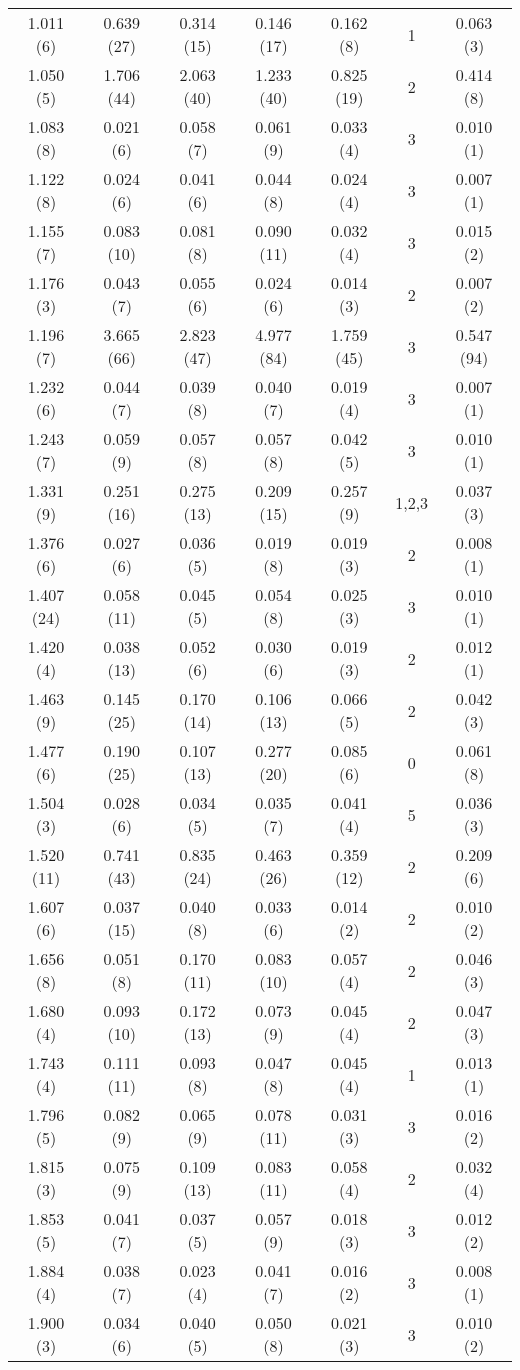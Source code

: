 \begin{table}
\begin{tabular}{c c c c c c c}
1.011 (6) & 0.639 (27) & 0.314 (15) & 0.146 (17) & 0.162 (8) & 1 & 0.063 (3) \\
1.050 (5) & 1.706 (44) & 2.063 (40) & 1.233 (40) & 0.825 (19) & 2 & 0.414 (8) \\
1.083 (8) & 0.021 (6) & 0.058 (7) & 0.061 (9) & 0.033 (4) & 3 & 0.010 (1) \\
1.122 (8) & 0.024 (6) & 0.041 (6) & 0.044 (8) & 0.024 (4) & 3 & 0.007 (1) \\
1.155 (7) & 0.083 (10) & 0.081 (8) & 0.090 (11) & 0.032 (4) & 3 & 0.015 (2) \\
1.176 (3) & 0.043 (7) & 0.055 (6) & 0.024 (6) & 0.014 (3) & 2 & 0.007 (2) \\
1.196 (7) & 3.665 (66) & 2.823 (47) & 4.977 (84) & 1.759 (45) & 3 & 0.547 (94) \\
1.232 (6) & 0.044 (7) & 0.039 (8) & 0.040 (7) & 0.019 (4) & 3 & 0.007 (1) \\
1.243 (7) & 0.059 (9) & 0.057 (8) & 0.057 (8) & 0.042 (5) & 3 & 0.010 (1) \\
1.331 (9) & 0.251 (16) & 0.275 (13) & 0.209 (15) & 0.257 (9) & 1,2,3 & 0.037 (3) \\
1.376 (6) & 0.027 (6) & 0.036 (5) & 0.019 (8) & 0.019 (3) & 2 & 0.008 (1) \\
1.407 (24) & 0.058 (11) & 0.045 (5) & 0.054 (8) & 0.025 (3) & 3 & 0.010 (1) \\
1.420 (4) & 0.038 (13) & 0.052 (6) & 0.030 (6) & 0.019 (3) & 2 & 0.012 (1) \\
1.463 (9) & 0.145 (25) & 0.170 (14) & 0.106 (13) & 0.066 (5) & 2 & 0.042 (3) \\
1.477 (6) & 0.190 (25) & 0.107 (13) & 0.277 (20) & 0.085 (6) & 0 & 0.061 (8) \\
1.504 (3) & 0.028 (6) & 0.034 (5) & 0.035 (7) & 0.041 (4) & 5 & 0.036 (3) \\
1.520 (11) & 0.741 (43) & 0.835 (24) & 0.463 (26) & 0.359 (12) & 2 & 0.209 (6) \\
1.607 (6) & 0.037 (15) & 0.040 (8) & 0.033 (6) & 0.014 (2) & 2 & 0.010 (2) \\
1.656 (8) & 0.051 (8) & 0.170 (11) & 0.083 (10) & 0.057 (4) & 2 & 0.046 (3) \\
1.680 (4) & 0.093 (10) & 0.172 (13) & 0.073 (9) & 0.045 (4) & 2 & 0.047 (3) \\
1.743 (4) & 0.111 (11) & 0.093 (8) & 0.047 (8) & 0.045 (4) & 1 & 0.013 (1) \\
1.796 (5) & 0.082 (9) & 0.065 (9) & 0.078 (11) & 0.031 (3) & 3 & 0.016 (2) \\
1.815 (3) & 0.075 (9) & 0.109 (13) & 0.083 (11) & 0.058 (4) & 2 & 0.032 (4) \\
1.853 (5) & 0.041 (7) & 0.037 (5) & 0.057 (9) & 0.018 (3) & 3 & 0.012 (2) \\
1.884 (4) & 0.038 (7) & 0.023 (4) & 0.041 (7) & 0.016 (2) & 3 & 0.008 (1) \\
1.900 (3) & 0.034 (6) & 0.040 (5) & 0.050 (8) & 0.021 (3) & 3 & 0.010 (2) \\
\hline \hline
\end{tabular}
\label{Sm1}
\end{table}

